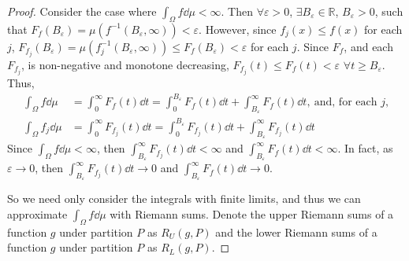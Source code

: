 \documentclass[12pt]{article}
\theoremstyle{plain}
\begin{document}
\begin{proof}
    Consider the case where $\int_\Omega f\dd\mu < \infty$.  Then $\forall \varepsilon > 0$, $\exists B_\varepsilon \in \mathbb{R}$, $B_\varepsilon > 0$, such that $F_f(B_\varepsilon) = \mu(f^{-1}(B_\varepsilon, \infty)) < \varepsilon$.  However, since $f_j(x) \leq f(x)$ for each $j$, $F_{f_j}(B_\varepsilon) = \mu(f_j^{-1}(B_\varepsilon, \infty)) \leq F_f(B_\varepsilon) < \varepsilon$ for each $j$.  Since $F_f$, and each $F_{f_j}$, is non-negative and monotone decreasing, $F_{f_j}(t) \leq F_f(t) < \varepsilon$ $\forall t \geq B_\varepsilon$.  Thus,
    \begin{align*}
        \int_\Omega f\dd\mu &= \int_0^\infty F_f(t) \dd t = \int_0^{B_\varepsilon} F_f(t) \dd t + \int_{B_\varepsilon}^\infty F_f(t) \dd t,\ \text{and, for each $j$,} \\
        \int_\Omega f_j\dd\mu &= \int_0^\infty F_{f_j}(t) \dd t = \int_0^{B_\varepsilon} F_{f_j}(t)\dd t + \int_{B_\varepsilon}^\infty F_{f_j}(t)\dd t
    \end{align*}
    Since $\int_\Omega f\dd\mu < \infty$, then $\int_{B_\varepsilon}^\infty F_{f_j}(t) \dd t < \infty$ and $\int_{B_\varepsilon}^\infty F_f(t) \dd t < \infty$.  In fact, as $\varepsilon \rightarrow 0$, then $\int_{B_\varepsilon}^\infty F_{f_j}(t) \dd t \rightarrow 0$ and $\int_{B_\varepsilon}^\infty F_f(t) \dd t \rightarrow 0$.

    So we need only consider the integrals with finite limits, and thus we can approximate $\int_\Omega f \dd \mu$ with Riemann sums.  Denote the upper Riemann sums of a function $g$ under partition $P$ as $R_U(g, P)$ and the lower Riemann sums of a function $g$ under partition $P$ as $R_L(g, P)$.


\end{proof}
\end{document}
